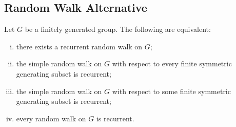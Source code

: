 \documentclass[10pt]{mypackage}
\begin{document}
\subsection{Random Walk Alternative}%
\begin{theorem}
  Let $G$ be a finitely generated group. The following are equivalent:
  \begin{enumerate}[(i)]
    \item there exists a recurrent random walk on $G$;
    \item the simple random walk on $G$ with respect to every finite symmetric generating subset is recurrent;
    \item the simple random walk on $G$ with respect to some finite symmetric generating subset is recurrent;
    \item every random walk on $G$ is recurrent.
  \end{enumerate}
\end{theorem}
\nocite{topics_in_groups_and_geometry}
\printbibliography
\end{document}
